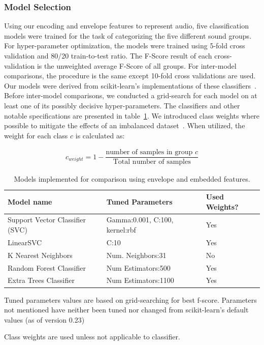 \documentclass[\main/thesis.tex]{subfiles}
\begin{document}
\subsubsection{Model Selection}
Using our encoding and envelope features to represent audio, five classification models were trained for the task of categorizing the five different sound groups. For hyper-parameter optimization, the models were trained using 5-fold cross validation and 80/20 train-to-test ratio. The F-Score result of each cross-validation is the unweighted average F-Score of all groups. For inter-model comparisons, the procedure is the same except 10-fold cross validations are used. Our models were derived from scikit-learn's implementations of these classifiers~\cite{pedregosa2011scikit}. Before inter-model comparisons, we conducted a grid-search for each model on at least one of its possibly decisive hyper-parameters. The classifiers and other notable specifications are presented in table~\ref{table:mem_model_selection}. We introduced class weights where possible to mitigate the effects of an imbalanced dataset~\cite{provost2000machine,chawla2004special}. When utilized, the weight for each class $c$  is calculated as:

\begin{subequations}
    \begin{align*}
    c_{weight} = 1-\dfrac{\text{number of samples in group $c$} }{\text{Total number of samples}}
    \end{align*}
\end{subequations}

\begin{table}[t]
    \centering \hspace*{-0.8cm}
    \begin{threeparttable}
    \begin{tabular}[width=0.95\paperwidth]{|l|l|l|}
    \hline
    Model name & Tuned Parameters\tnote{\dag}  & Used Weights? \tnote{\ddag} \\\hline
     Support Vector Classifier (SVC) &  Gamma:0.001, C:100, kernel:rbf & Yes\\
     LinearSVC & C:10 & Yes\\
     K Nearest Neighbors & Num. Neighbors:31 &  No \\
     Random Forest Classifier & Num Estimators:500 & Yes \\
     Extra Trees Classifier & Num Estimators:1100 & Yes\\
     \hline
    \end{tabular}
    \caption{Models implemented for comparison using envelope and embedded features. }
    \begin{tablenotes}
    \item[\dag] Tuned parameters values are based on grid-searching for best f-score. Parameters not mentioned have neither been tuned nor changed from scikit-learn's default values (as of version 0.23)
    \item[\ddag] Class weights are used unless not applicable to classifier.
    \end{tablenotes}
    \label{table:mem_model_selection}
    \end{threeparttable}
\end{table}
\end{document}
